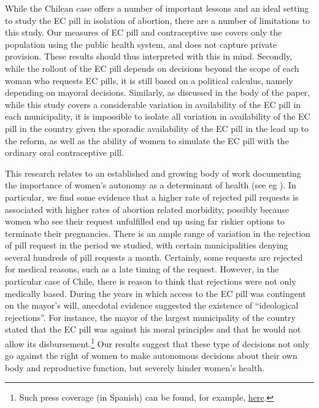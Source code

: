 \documentclass[12pt]{article}
\begin{document}
\begin{spacing}{1.9}
  While the Chilean case offers a number of important lessons and an ideal setting to study the EC pill in isolation of abortion, there are a number of limitations to this study.  Our measures of EC pill and contraceptive use covers only the population using the public health system, and does not capture private provision.  These results should thus interpreted with this in mind.  Secondly, while the rollout of the EC pill depends on decisions beyond the scope of each woman who requests EC pills, it is still based on a political calculus, namely depending on mayoral decisions.  Similarly, as discussed in the body of the paper, while this study covers a considerable variation in availability of the EC pill in each municipality, it is impossible to isolate all variation in availability of the EC pill in the country given the sporadic availability of the EC pill in the lead up to the reform, as well as the ability of women to simulate the EC pill with the ordinary oral contraceptive pill.

  This research relates to an established and growing body of work documenting the importance of women's autonomy as a determinant of health (see eg \citet{Bloometal2001}).  In particular, we find some evidence that a higher rate of rejected pill requests is associated with higher rates of abortion related morbidity, possibly because women who see their request unfulfilled end up using far riskier options to terminate their pregnancies.  There is an ample range of variation in the rejection of pill request in the period we studied, with certain municipalities denying several hundreds of pill requests a month. Certainly, some requests are rejected for medical reasons, such as a late timing of the request. However, in the particular case of Chile, there is reason to think that rejections were not only medically based. During the years in which access to the EC pill was contingent on the mayor's will, anecdotal evidence suggested the existence of ``ideological rejections''. For instance, the mayor of the largest municipality of the country stated that the EC pill was against his moral principles and that he would not allow its disbursement.\footnote{Such press coverage (in Spanish) can be found, for example, \href{https://www.latercera.com/noticia/pildora-del-dia-despues-alcaldes-de-el-bosque-y-puente-alto-discrepan-por-dictamen-de-contraloria}{here}.} Our results suggest that these type of decisions not only go against the right of women to make autonomous decisions about their own body and reproductive function, but severely hinder women's health.
  
\end{spacing}
\clearpage


\clearpage
\end{document}
